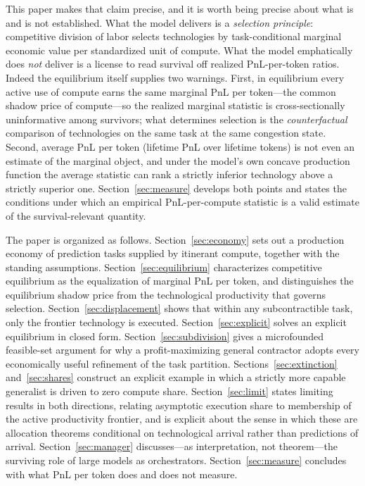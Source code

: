 \documentclass[11pt]{article}
\theoremstyle{definition}
\theoremstyle{remark}
\begin{document}
This paper makes that claim precise, and it is worth being precise about what is and is not established. What the model delivers is a \emph{selection principle}: competitive division of labor selects technologies by task-conditional marginal economic value per standardized unit of compute. What the model emphatically does \emph{not} deliver is a license to read survival off realized PnL-per-token ratios. Indeed the equilibrium itself supplies two warnings. First, in equilibrium every active use of compute earns the same marginal PnL per token---the common shadow price of compute---so the realized marginal statistic is cross-sectionally uninformative among survivors; what determines selection is the \emph{counterfactual} comparison of technologies on the same task at the same congestion state. Second, average PnL per token (lifetime PnL over lifetime tokens) is not even an estimate of the marginal object, and under the model's own concave production function the average statistic can rank a strictly inferior technology above a strictly superior one. Section~\ref{sec:measure} develops both points and states the conditions under which an empirical PnL-per-compute statistic is a valid estimate of the survival-relevant quantity.

The paper is organized as follows. Section~\ref{sec:economy} sets out a production economy of prediction tasks supplied by itinerant compute, together with the standing assumptions. Section~\ref{sec:equilibrium} characterizes competitive equilibrium as the equalization of marginal PnL per token, and distinguishes the equilibrium shadow price from the technological productivity that governs selection. Section~\ref{sec:displacement} shows that within any subcontractible task, only the frontier technology is executed. Section~\ref{sec:explicit} solves an explicit equilibrium in closed form. Section~\ref{sec:subdivision} gives a microfounded feasible-set argument for why a profit-maximizing general contractor adopts every economically useful refinement of the task partition. Sections~\ref{sec:extinction} and~\ref{sec:shares} construct an explicit example in which a strictly more capable generalist is driven to zero compute share. Section~\ref{sec:limit} states limiting results in both directions, relating asymptotic execution share to membership of the active productivity frontier, and is explicit about the sense in which these are allocation theorems conditional on technological arrival rather than predictions of arrival. Section~\ref{sec:manager} discusses---as interpretation, not theorem---the surviving role of large models as orchestrators. Section~\ref{sec:measure} concludes with what PnL per token does and does not measure.
\end{document}
